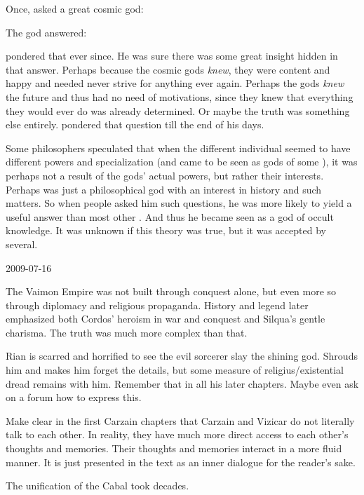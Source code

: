 Once, \Ishnaruchaefir asked a great cosmic god:

The god answered: 

\Ishnaruchaefir pondered that ever since. 
He was sure there was some great insight hidden in that answer. 
Perhaps because the cosmic gods \emph{knew}, they were content and happy and needed never strive for anything ever again. 
Perhaps the gods \emph{knew} the future and thus had no need of motivations, since they knew that everything they would ever do was already determined. 
Or maybe the truth was something else entirely.
\Ishnaruchaefir pondered that question till the end of his days. 


Some \draconian philosophers speculated that when the different individual \xss seemed to have different powers and specialization (and came to be seen as gods of some ), it was perhaps not a result of the gods' actual powers, but rather their interests.
Perhaps \NerranKoss was just a philosophical god with an interest in history and such matters. 
So when people asked him such questions, he was more likely to yield a useful answer than most other \xss.
And thus he became seen as a god of occult knowledge. 
It was unknown if this theory was true, but it was accepted by several. 



2009-07-16


The Vaimon Empire was not built through conquest alone, but even more so through diplomacy and religious propaganda.
History and legend later emphasized both Cordos' heroism in war and conquest and Silqua's gentle charisma. 
The truth was much more complex than that. 


Rian is scarred and horrified to see the evil sorcerer slay the shining god. 
\Criseis Shrouds him and makes him forget the details, but some measure of religius/existential dread remains with him. 
Remember that in all his later chapters.
Maybe even ask on a forum how to express this. 


Make clear in the first Carzain chapters that Carzain and Vizicar do not literally talk to each other. 
In reality, they have much more direct access to each other's thoughts and memories. 
Their thoughts and memories interact in a more fluid manner. 
It is just presented in the text as an inner dialogue for the reader's sake.


The unification of the Cabal took decades. 


